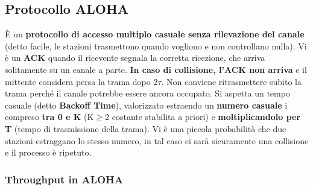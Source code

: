 \documentclass[12pt]{article}
\begin{document}
\subsection{Protocollo ALOHA}

È un \textbf{protocollo di accesso multiplo casuale senza rilevazione del canale} (detto facile, le stazioni trasmettono quando vogliono e non controllano nulla). Vi è un \textbf{ACK} quando il ricevente segnala la corretta ricezione, che arriva solitamente su un canale a parte. \textbf{In caso di collisione, l'ACK non arriva} e il mittente considera persa la trama dopo $2\tau$. Non conviene ritrasmettere subito la trama perché il canale potrebbe essere ancora occupato. Si aspetta un tempo casuale (detto \textbf{Backoff Time}), valorizzato estraendo un \textbf{numero casuale} i compreso\textbf{ tra 0 e K} (K$\geq$2 costante stabilita a priori) e \textbf{moltiplicandolo per T} (tempo di trasmissione della trama). Vi è una piccola probabilità che due stazioni estraggano lo stesso numero, in tal caso ci sarà sicuramente una collisione e il processo è ripetuto.

\subsubsection{Throughput in ALOHA}
\end{document}
